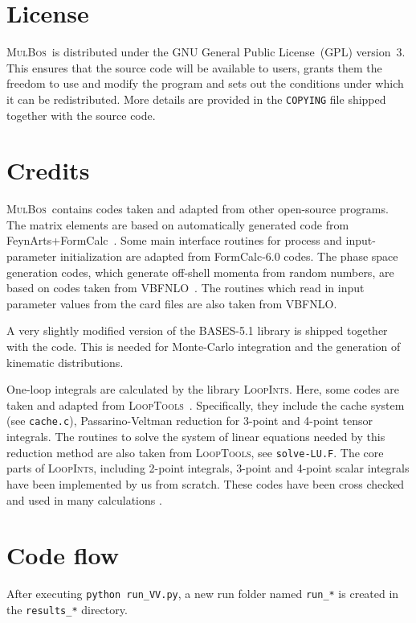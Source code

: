 \documentclass[english,12pt]{article}
\newcommand{\vbfnlo}{\textsc{VBFNLO}}
\newcommand{\bases}{\textsc{BASES}}
\newcommand{\mulbos}{\textsc{MulBos}}
\newcommand{\loopints}{\textsc{LoopInts}}
\newcommand{\looptools}{\textsc{LoopTools}}
\begin{document}
\section{License}
\mulbos\ is distributed under the GNU General Public License~(GPL)
version~3. This ensures that the source code will be available to users,
grants them the freedom to use and modify the program and sets
out the conditions under which it can be redistributed. More details 
are provided in the {\tt COPYING} file shipped together with the source code.
\section{Credits}
\mulbos\ contains codes taken and adapted from other open-source programs.
The matrix elements are based on automatically
generated code from {\sc FeynArts+FormCalc}~\cite{Kublbeck:1990xc, 
Hahn:1998yk, Hahn:2000kx, Hahn:2006qw}. 
Some main interface routines for process and input-parameter initialization are adapted 
from {\sc FormCalc-6.0} codes. 
The phase space generation codes, which generate off-shell momenta from random numbers, 
are based on codes taken from \vbfnlo\ \cite{Arnold:2008rz,Baglio:2014uba,Baglio:2024gyp}. 
The routines which read in input parameter values from the card files are 
also taken from \vbfnlo.

A very slightly modified version of the \bases-5.1 \cite{Kawabata:1985yt,Kawabata:1995th} library is shipped 
together with the code. This is needed for Monte-Carlo integration and the generation of kinematic distributions. 

One-loop integrals are calculated by the library \loopints. Here, some codes are 
taken and adapted from \looptools\ \cite{Hahn:1998yk}. Specifically, they include the cache system (see {\tt cache.c}), 
Passarino-Veltman reduction for 3-point and 4-point tensor integrals. The routines to solve the system 
of linear equations needed by this reduction method are also taken from \looptools, see {\tt solve-LU.F}. 
The core parts of \loopints, including 2-point integrals, 3-point and 4-point scalar integrals have been implemented by us from scratch. 
These codes have been cross checked and used in many calculations \cite{Nhung:2009pm,Boudjema:2009pw,Nhung:2013jta,Campanario:2013qba,Baglio:2018rcu,Dao:2024ffg}.
\section{Code flow}
\label{sec:code_flow}
After executing {\tt python run\_VV.py}, a new run folder named {\tt run\_*} is 
created in the {\tt results\_*} directory. 
\end{document}
